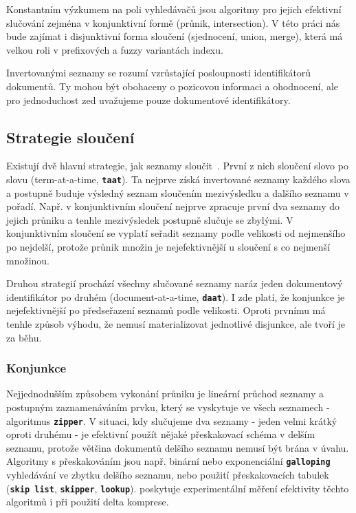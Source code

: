 \documentclass[11pt,letterpaper,oneside,openright]{book}
\newcommand{\bftt}[1]{\texttt{\textbf{#1}}}
\begin{document}
Konstantním výzkumem na poli vyhledávačů jsou algoritmy pro jejich efektivní
slučování zejména v konjunktivní formě (průnik, intersection). V této práci nás
bude zajímat i disjunktivní forma sloučení (sjednocení, union, merge), která má
velkou roli v prefixových a fuzzy variantách indexu.

Invertovanými seznamy se rozumí vzrůstající posloupnosti identifikátorů
dokumentů. Ty mohou být obohaceny o pozicovou informaci a ohodnocení, ale pro
jednoduchost zed uvažujeme pouze dokumentové identifikátory.

\subsection{Strategie sloučení}
Existují dvě hlavní strategie, jak seznamy
sloučit~\cite{Lacour_efficiencycomparison}. První z nich sloučení slovo po
slovu (term-at-a-time, \bftt{taat}). Ta nejprve získá invertované seznamy
každého slova a postupně buduje výsledný seznam sloučením mezivýsledku a
dalšího seznamu v pořadí. Např. v konjunktivním sloučení nejprve zpracuje první
dva seznamy do jejich průniku a tenhle mezivýsledek postupně slučuje se
zbylými. V konjunktivním sloučení se vyplatí seřadit seznamy podle velikosti od
nejmenšího po nejdelší, protože průnik množin je nejefektivnější u sloučení s
co nejmenší množinou.

Druhou strategií prochází všechny slučované seznamy naráz jeden dokumentový
identifikátor po druhém (document-at-a-time, \bftt{daat}). I zde platí, že konjunkce
je nejefektivnější po předseřazení seznamů podle velikosti. Oproti prvnímu má
tenhle způsob výhodu, že nemusí materializovat jednotlivé disjunkce, ale tvoří
je za běhu.

\subsubsection{Konjunkce}
Nejjednodušším způsobem vykonání průniku je lineární průchod seznamy a postupným
zaznamenáváním prvku, který se vyskytuje ve všech seznamech - algoritmus
\bftt{zipper}. V situaci, kdy slučujeme dva seznamy - jeden velmi krátký oproti
druhému - je efektivní použít nějaké přeskakovací schéma v delším seznamu,
protože většina dokumentů delšího seznamu nemusí být brána v úvahu. Algoritmy s
přeskakováním jsou např. binární nebo exponenciální \bftt{galloping}
vyhledávání ve zbytku delšího seznamu, nebo použití přeskakovacích tabulek
(\bftt{skip list}, \bftt{skipper}, \bftt{lookup}).
\cite{Sanders:2007:III:2791188.2791195} poskytuje experimentální měření
efektivity těchto algoritmů i při použití delta komprese.
\end{document}
